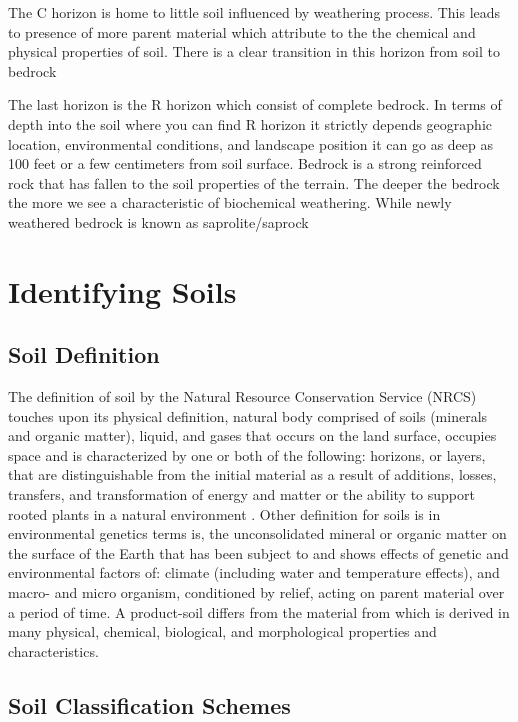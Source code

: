 The C horizon is home to little soil influenced by weathering process. This leads to presence of more parent material which attribute to the the chemical and physical properties of soil. There is a clear transition in this horizon from soil to bedrock

The last horizon is the R horizon which consist of complete bedrock. In terms of depth into the soil where you can find R horizon it strictly depends geographic location, environmental conditions, and landscape position it can go as deep as 100 feet or a few centimeters from soil surface. Bedrock is a strong reinforced rock that has fallen to the soil properties of the terrain. The deeper the bedrock the more we see a characteristic of biochemical weathering. While newly weathered bedrock is known as saprolite/saprock 

\section{Identifying Soils}

\subsection{Soil Definition}

The definition of soil by the Natural Resource Conservation Service (NRCS) touches upon its physical definition, natural body comprised of soils (minerals and organic matter), liquid, and gases that occurs on the land surface, occupies space and is characterized by one or both of the following: horizons, or layers, that are distinguishable from the initial material as a result of additions, losses, transfers, and transformation of energy and matter or the ability to support rooted plants in a natural environment \citep{baillie2001soil}. Other definition for soils is in environmental genetics terms is, the unconsolidated mineral or organic matter on the surface of the Earth that has been subject to and shows effects of genetic and environmental factors of: climate (including water and temperature effects), and macro- and micro organism, conditioned by relief, acting on parent material over a period of time. A product-soil differs from the material from which is derived in many physical, chemical, biological, and morphological properties and characteristics. 
 
\subsection {Soil Classification Schemes}

